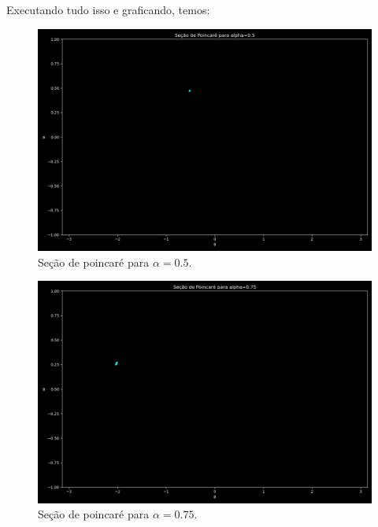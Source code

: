\documentclass[12pt,a4paper]{article}
\begin{document}
Executando tudo isso e graficando, temos:

\begin{figure}[H]
\centering
\includegraphics[width=\textwidth]{../tarefa-4c/secao_poincare_alpha_0.5.png}
\caption{Seção de poincaré para $\alpha = 0.5$.}
\end{figure}

\begin{figure}[H]
\centering
\includegraphics[width=\textwidth]{../tarefa-4c/secao_poincare_alpha_0.75.png}
\caption{Seção de poincaré para $\alpha = 0.75$.}
\end{figure}
\end{document}

